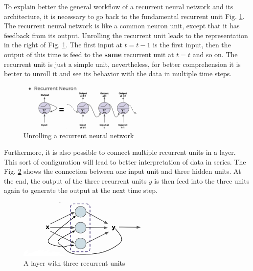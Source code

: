 \documentclass{article}
\begin{document}
To explain better the general workflow of a recurrent neural network and its architecture, it is necessary to go back to the fundamental recurrent unit Fig. \ref{fig:f18}. The recurrent neural network is like a common neuron unit, except that it has feedback from its output. Unrolling the recurrent unit leads to the representation in the right of Fig. \ref{fig:f18}. The first input at \(t = t-1\) is the first input, then the output of this time is feed to the \textbf{same} recurrent unit at \(t = t\) and so on. The recurrent unit is just a simple unit, nevertheless, for better comprehension it is better to unroll it and see its behavior with the data in multiple time steps. 

\begin{figure}[ht]
    \centering
    \includegraphics[width=0.55\textwidth,height=0.55\textheight,keepaspectratio]{images/unrolling.png}
    \captionsetup{justification=centering}
    \caption{Unrolling a recurrent neural network}
    \label{fig:f18}
\end{figure}

Furthermore, it is also possible to connect multiple recurrent units in a layer. This sort of configuration will lead to better interpretation of data in series. The Fig. \ref{fig:f19} shows the connection between one input unit and three hidden units. At the end, the output of the three recurrent units \(y\) is then feed into the three units again to generate the output at the next time step. 

\begin{figure}[ht]
    \centering
    \includegraphics[width=0.65\textwidth,height=0.65\textheight,keepaspectratio]{images/mutiple_memorycells.png}
    \captionsetup{justification=centering}
    \caption{A layer with three recurrent units}
    \label{fig:f19}
\end{figure}
\end{document}
